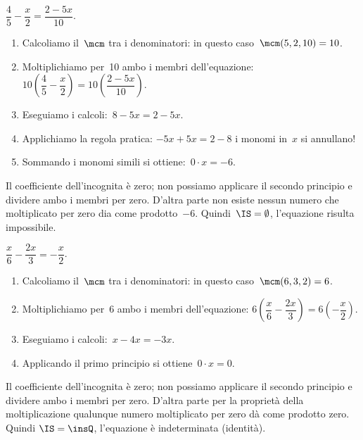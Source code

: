 \begin{exrig}\vspace{1.10ex}
 \begin{esempio}
 $\dfrac{4}{5}-\dfrac{x}{2}=\dfrac{2-5x}{10}$.

 \begin{enumerate}
  \item Calcoliamo il~$\mcm$ tra i denominatori: in questo
caso~$\mcm(5, 2, 10) = 10$.
  \item Moltiplichiamo per~10 ambo i membri
dell'equazione:
$10\left(\dfrac{4}{5}-\dfrac{x}{2}\right)=10\left(\dfrac{2-5x}{10}\right)$.
  \item Eseguiamo i calcoli:~$8-5x=2-5x$.
  \item Applichiamo la regola pratica:
$-5x+5x=2-8$ i monomi in~$x$ si annullano!
  \item Sommando i monomi simili si ottiene:~$0\cdot x=-6$.
 \end{enumerate}

Il coefficiente dell'incognita è zero; non possiamo
applicare il secondo principio e dividere ambo i membri per zero.
D'altra parte non esiste nessun numero che moltiplicato
per zero dia come prodotto~$-6$. Quindi~$\IS =\emptyset $,
l'equazione risulta impossibile.
 \end{esempio}

 \begin{esempio}
$\dfrac{x}{6}-\dfrac{2x}{3}=-{\dfrac{x}{2}}$.

\begin{enumerate}
 \item Calcoliamo il~$\mcm$ tra i denominatori: in questo
caso~$\mcm(6, 3, 2) = 6$.
 \item Moltiplichiamo per~6 ambo i membri
dell'equazione:
$6\left(\dfrac{x}{6}-\dfrac{2x}{3}\right)=6\left(-{\dfrac{x}{2}}\right)$.
 \item Eseguiamo i calcoli:~$x-4x=-3x$.
 \item Applicando il primo principio si ottiene~$0\cdot x=0$.
\end{enumerate}

Il coefficiente dell'incognita è zero; non possiamo
applicare il secondo principio e dividere ambo i membri per zero.
D'altra parte per la proprietà della moltiplicazione
qualunque numero moltiplicato per zero dà come prodotto zero. Quindi
$\IS = \insQ$, l'equazione è indeterminata (identità).
 \end{esempio}

\end{exrig}

